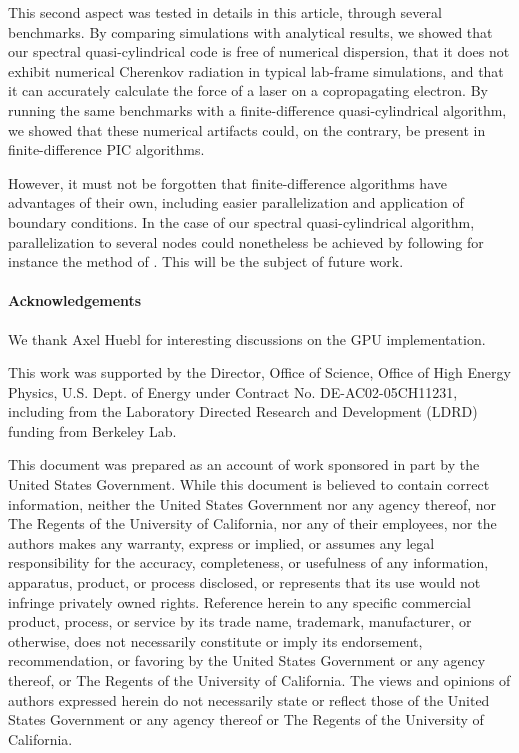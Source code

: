 \documentclass[1p,times,authoryear]{elsarticle}
\begin{document}
This second aspect was tested in details in this article, through
several benchmarks. By comparing simulations with analytical results, 
we showed that our spectral quasi-cylindrical code is free of
numerical dispersion, that it does not exhibit numerical Cherenkov radiation in typical lab-frame
simulations, and that it can accurately calculate the force of a
laser on a copropagating electron. By running the
same benchmarks with a finite-difference quasi-cylindrical algorithm, we showed that
these numerical artifacts could, on the contrary, be present in
finite-difference PIC algorithms. 

However, it must not be forgotten that
finite-difference algorithms have advantages of their own, including
easier parallelization and application of boundary conditions. In the
case of our spectral quasi-cylindrical algorithm, parallelization to
several nodes could nonetheless be achieved by following for instance the
method of \citep{VayJCP2013}. This will be the subject of future work. 

\paragraph{Acknowledgements}

We thank Axel Huebl for interesting discussions on the GPU implementation.

This work was supported by the Director, Office of Science, Office of High Energy Physics, U.S. Dept. of Energy under Contract No. DE-AC02-05CH11231, including from the Laboratory Directed Research and Development (LDRD) funding from Berkeley Lab.

This document was prepared as an account of work sponsored in part by the United States Government. While this document is believed to contain correct information, neither the United States Government nor any agency thereof, nor The Regents of the University of California, nor any of their employees, nor the authors makes any warranty, express or implied, or assumes any legal responsibility for the accuracy, completeness, or usefulness of any information, apparatus, product, or process disclosed, or represents that its use would not infringe privately owned rights. Reference herein to any specific commercial product, process, or service by its trade name, trademark, manufacturer, or otherwise, does not necessarily constitute or imply its endorsement, recommendation, or favoring by the United States Government or any agency thereof, or The Regents of the University of California. The views and opinions of authors expressed herein do not necessarily state or reflect those of the United States Government or any agency thereof or The Regents of the University of California.

\newpage
\appendix





\end{document}
